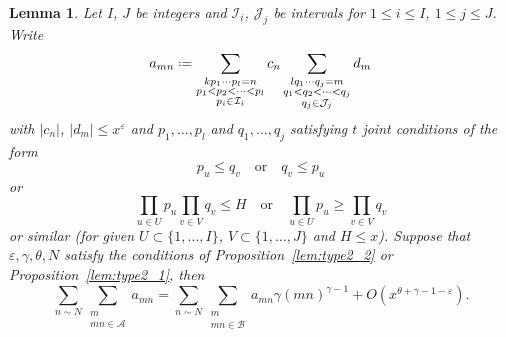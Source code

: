 \documentclass[12pt, reqno, twoside, letterpaper]{amsart}
\numberwithin{equation}{section}
\newcommand{\cA}{\ensuremath{\mathcal{A}}}
\newcommand{\cB}{\ensuremath{\mathcal{B}}}
\newcommand{\cI}{\ensuremath{\mathcal{I}}}
\newcommand{\cJ}{\ensuremath{\mathcal{J}}}
\theoremstyle{customthm}
\newtheorem{lemma}[X]{Lemma}
\theoremstyle{customrem}
\newcommand*{\defeq}{\mathrel{\vcenter{\baselineskip0.5ex \lineskiplimit0pt
			\hbox{\scriptsize.}\hbox{\scriptsize.}}}%
	=}
\begin{document}
\begin{lemma}\label{a_mn}
Let $I$, $J$ be integers and $\cI_i$, $\cJ_j$ be intervals for $1 \leqslant i \leqslant I$, $1 \leqslant j \leqslant J$. Write
\begin{align}\label{definition of a_mn}
a_{mn} \defeq \sum_{\substack{kp_1 \cdots p_l = n \\ p_1 < p_2 < \cdots < p_l \\ p_i \in \cI_i}} c_{n}
\sum_{\substack{lq_1 \cdots q_j = m \\ q_1 < q_2 < \cdots < q_j \\ q_j \in \cJ_j}} d_{m}
\end{align}
with $|c_n|$, $|d_m| \leqslant x^{\varepsilon}$ and $p_1, \ldots, p_l$ and $q_1, \ldots, q_j$ satisfying $t$ joint conditions of the form
$$
p_u \leqslant q_v \quad \text{or} \quad q_v \leqslant p_u
$$
or
$$
\prod_{u \in U} p_u\prod_{v \in V} q_v \leqslant H \quad \text{or} \quad \prod_{u \in U} p_u \geqslant \prod_{v \in V} q_v
$$
or similar (for given $U \subset \{1, \ldots, I \}$, $V \subset \{1, \ldots, J\}$ and $H\leqslant x$). Suppose that $\varepsilon, \gamma, \theta, N$ satisfy the conditions of Proposition~\ref{lem:type2_2} or Proposition~\ref{lem:type2_1}, then
$$
\sum_{n \sim N} \sum_{\substack{m \\ mn \in \cA}} a_{mn} = \sum_{n \sim N} \sum_{\substack{m \\ mn \in \cB}} a_{mn} \gamma(mn)^{\gamma-1} + O(x^{\theta + \gamma - 1 -\varepsilon}).
$$
\end{lemma}
\end{document}
